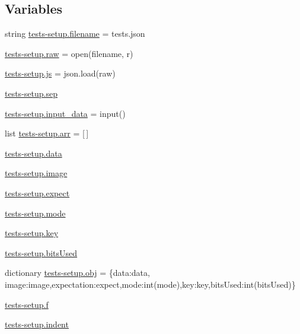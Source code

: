 \subsection*{Variables}
\begin{DoxyCompactItemize}
\item 
string \mbox{\hyperlink{namespacetests-setup_a1c1b6d4c14026d664106586c65e10a94}{tests-\/setup.\+filename}} = \textquotesingle{}tests.\+json\textquotesingle{}
\item 
\mbox{\hyperlink{namespacetests-setup_a16d40f6dd9430f3bdc79db2d00aab267}{tests-\/setup.\+raw}} = open(filename, \textquotesingle{}r\textquotesingle{})
\item 
\mbox{\hyperlink{namespacetests-setup_a94275a2f2d070d13dedc7e8dfaf4faa0}{tests-\/setup.\+js}} = json.\+load(raw)
\item 
\mbox{\hyperlink{namespacetests-setup_a92ab4d3dccd0fc5347ed0f5399869803}{tests-\/setup.\+sep}}
\item 
\mbox{\hyperlink{namespacetests-setup_a1e5de3b19e0107100d5df9b7e2122764}{tests-\/setup.\+input\+\_\+data}} = input()
\item 
list \mbox{\hyperlink{namespacetests-setup_a274aaa7c0d5733ef5f48372d9481f34a}{tests-\/setup.\+arr}} = \mbox{[}$\,$\mbox{]}
\item 
\mbox{\hyperlink{namespacetests-setup_a6b4da66e7d24a18856de9023a2dcede4}{tests-\/setup.\+data}}
\item 
\mbox{\hyperlink{namespacetests-setup_ad55b685280f549e15688a94cbb89f512}{tests-\/setup.\+image}}
\item 
\mbox{\hyperlink{namespacetests-setup_a2c17344dec99b9aaaddaef4438b1f793}{tests-\/setup.\+expect}}
\item 
\mbox{\hyperlink{namespacetests-setup_a04126d10edec6b3171e1b55a00309b23}{tests-\/setup.\+mode}}
\item 
\mbox{\hyperlink{namespacetests-setup_a3a21e3298c630c17fc27ca5ab146a8af}{tests-\/setup.\+key}}
\item 
\mbox{\hyperlink{namespacetests-setup_a64974eb034f518d24195739395783d3d}{tests-\/setup.\+bits\+Used}}
\item 
dictionary \mbox{\hyperlink{namespacetests-setup_afb80c1236926b5468a6d3e942a527a96}{tests-\/setup.\+obj}} = \{\textquotesingle{}data\textquotesingle{}\+:data, \textquotesingle{}image\textquotesingle{}\+:image,\textquotesingle{}expectation\textquotesingle{}\+:expect,\textquotesingle{}mode\textquotesingle{}\+:int(mode),\textquotesingle{}key\textquotesingle{}\+:key,\textquotesingle{}bits\+Used\textquotesingle{}\+:int(bits\+Used)\}
\item 
\mbox{\hyperlink{namespacetests-setup_a919f85fdaaec93d91baf4a46863c31fd}{tests-\/setup.\+f}}
\item 
\mbox{\hyperlink{namespacetests-setup_aee04695e456c1d05ed5119e87842fc86}{tests-\/setup.\+indent}}
\end{DoxyCompactItemize}
